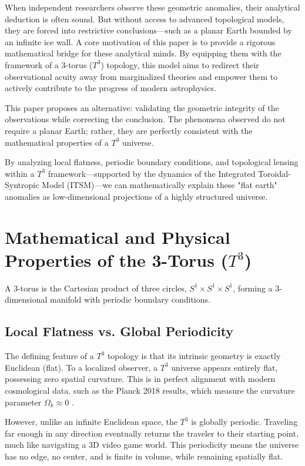 \documentclass[aps,prd,11pt,onecolumn,superscriptaddress,nofootinbib,floatfix]{revtex4-2}
\begin{document}
When independent researchers observe these geometric anomalies, their analytical deduction is often sound. But without access to advanced topological models, they are forced into restrictive conclusions—such as a planar Earth bounded by an infinite ice wall. A core motivation of this paper is to provide a rigorous mathematical bridge for these analytical minds. By equipping them with the framework of a 3-torus ($T^3$) topology, this model aims to redirect their observational acuity away from marginalized theories and empower them to actively contribute to the progress of modern astrophysics.

This paper proposes an alternative: validating the geometric integrity of the observations while correcting the conclusion. The phenomena observed do not require a planar Earth; rather, they are perfectly consistent with the mathematical properties of a $T^3$ universe. 

By analyzing local flatness, periodic boundary conditions, and topological lensing within a $T^3$ framework—supported by the dynamics of the Integrated Toroidal-Syntropic Model (ITSM)—we can mathematically explain these "flat earth" anomalies as low-dimensional projections of a highly structured universe.

\section{Mathematical and Physical Properties of the 3-Torus ($T^3$)}
\label{sec:t3-properties}

A 3-torus is the Cartesian product of three circles, $S^1 \times S^1 \times S^1$, forming a 3-dimensional manifold with periodic boundary conditions.

\subsection{Local Flatness vs. Global Periodicity}
The defining feature of a $T^3$ topology is that its intrinsic geometry is exactly Euclidean (flat). To a localized observer, a $T^3$ universe appears entirely flat, possessing zero spatial curvature. This is in perfect alignment with modern cosmological data, such as the Planck 2018 results, which measure the curvature parameter $\Omega_k \approx 0$ \cite{planck_2018}. 

However, unlike an infinite Euclidean space, the $T^3$ is globally periodic. Traveling far enough in any direction eventually returns the traveler to their starting point, much like navigating a 3D video game world. This periodicity means the universe has no edge, no center, and is finite in volume, while remaining spatially flat.
\end{document}
